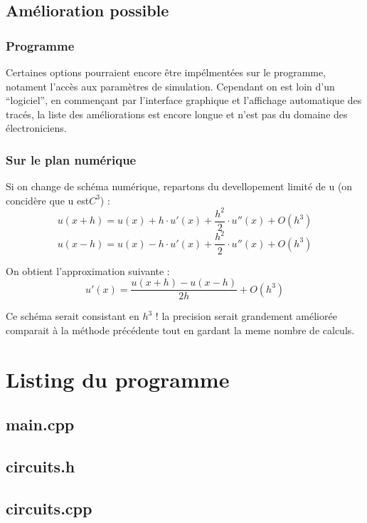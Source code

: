 \documentclass[a4paper,11pt]{article}
\begin{document}
\subsection{Amélioration possible}
\subsubsection{Programme}
Certaines options pourraient encore être impélmentées sur le programme, notament l'accès aux paramètres de simulation. 
Cependant on est loin d'un ``logiciel'', en commençant par l'interface graphique et l'affichage automatique des tracés,
la liste des améliorations est encore longue et n'est pas du domaine des électroniciens.

\subsubsection{Sur le plan numérique}
Si on change de schéma numérique, repartons du devellopement limité de u (on concidère que u est$ C^3$) :\\
\begin{equation*}
 u(x+h)=u(x)+h\cdot u'(x)+\frac{h^2}{2}\cdot u''(x)+O(h^3)
\end{equation*}
\begin{equation*}
 u(x-h)=u(x)-h\cdot u'(x)+\frac{h^2}{2}\cdot u''(x)+O(h^3)
\end{equation*}

On obtient l'approximation suivante :
\begin{equation*}
u'(x)=\frac{u(x+h)-u(x-h)}{2h}+O(h^3)
\end{equation*}

Ce schéma serait consistant en $h^3$ ! la precision serait grandement améliorée comparait à la méthode précédente tout en gardant la meme nombre de calculs. 


  \newpage
  \appendix
  \section{Listing du programme}
  \subsection{main.cpp}
    
    \newpage
  \subsection{circuits.h}
    
    \newpage
  \subsection{circuits.cpp}
    
    \newpage
\end{document}
